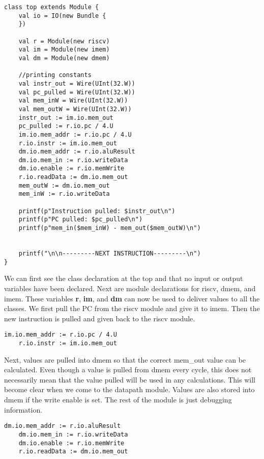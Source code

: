 \documentclass[12pt, letterpaper]{report}
\begin{document}
\begin{lstlisting}[style=scala]
    class top extends Module {
    val io = IO(new Bundle {
    })

    val r = Module(new riscv)
    val im = Module(new imem)
    val dm = Module(new dmem)

    //printing constants
    val instr_out = Wire(UInt(32.W))
    val pc_pulled = Wire(UInt(32.W))
    val mem_inW = Wire(UInt(32.W))
    val mem_outW = Wire(UInt(32.W))
    instr_out := im.io.mem_out
    pc_pulled := r.io.pc / 4.U
    im.io.mem_addr := r.io.pc / 4.U
    r.io.instr := im.io.mem_out
    dm.io.mem_addr := r.io.aluResult
    dm.io.mem_in := r.io.writeData
    dm.io.enable := r.io.memWrite
    r.io.readData := dm.io.mem_out
    mem_outW := dm.io.mem_out
    mem_inW := r.io.writeData

    printf(p"Instruction pulled: $instr_out\n")
    printf(p"PC pulled: $pc_pulled\n")
    printf(p"mem_in($mem_inW) - mem_out($mem_outW)\n")
    

    printf("\n\n---------NEXT INSTRUCTION---------\n")
}
\end{lstlisting}

We can first see the class declaration at the top and that no input or output variables have been declared.
Next are module declarations for riscv, dmem, and imem. These variables \textbf{r}, \textbf{im}, and \textbf{dm} can
now be used to deliver values to all the classes. We first pull the PC from the riscv module and give it to imem. Then 
the new instruction is pulled and given back to the riscv module. 

\begin{lstlisting}[style=scala]
    im.io.mem_addr := r.io.pc / 4.U
    r.io.instr := im.io.mem_out
\end{lstlisting}

Next, values are pulled into dmem so that the correct mem\_out value can be calculated.
Even though a value is pulled from dmem every cycle, 
this does not necessarily mean that the value pulled will be used in any calculations. 
This will become clear when we come to the datapath module. Values are also stored into dmem if the write enable is set.
The rest of the module is just debugging information. 

\begin{lstlisting}[style=scala]
    dm.io.mem_addr := r.io.aluResult
    dm.io.mem_in := r.io.writeData
    dm.io.enable := r.io.memWrite
    r.io.readData := dm.io.mem_out
\end{lstlisting}
\end{document}
